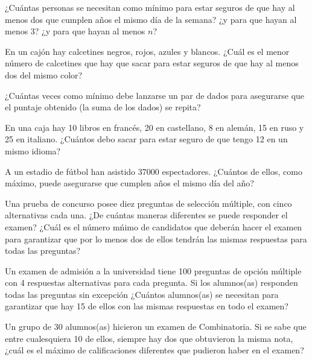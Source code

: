 \begin{problema}
    ¿Cuántas personas se necesitan como mínimo para estar seguros de que hay al menos dos que cumplen años el mismo día de la semana? ¿y para que hayan al menos 3? ¿y para que hayan al menos $n$?
\end{problema}

\begin{problema}
    En un cajón hay calcetines negros, rojos, azules y blancos. ¿Cuál es el menor número de calcetines que hay que sacar para estar seguros de que hay al menos dos del mismo color?
\end{problema}

\begin{problema}
    ¿Cuántas veces como mínimo debe lanzarse un par de dados para asegurarse que el puntaje obtenido (la suma de los dados) se repita?
\end{problema}

\begin{problema}
    En una caja hay 10 libros en francés, 20 en castellano, 8 en alemán, 15 en ruso y 25 en italiano. ¿Cuántos debo sacar para estar seguro de que tengo 12 en un mismo idioma?
\end{problema}

\begin{problema}
    A un estadio de fútbol han asistido 37000 espectadores. ¿Cuántos de ellos, como máximo, puede asegurarse que cumplen años el mismo día del año?
\end{problema}

\begin{problema}
    Una prueba de concurso posee diez preguntas de selección múltiple, con cinco alternativas cada una. ¿De cuántas maneras diferentes se puede responder el examen? ¿Cuál es el número mńimo de candidatos que deberán hacer el examen para garantizar que por lo menos dos de ellos tendrán las mismas respuestas para todas las preguntas?
\end{problema}

\begin{problema}
    Un examen de admisión a la universidad tiene 100 preguntas de opción múltiple con 4 respuestas alternativas para cada pregunta. Si los alumnos(as) responden todas las preguntas sin excepción ¿Cuántos alumnos(as) se necesitan para garantizar que hay 15 de ellos con las mismas respuestas en todo el examen?
\end{problema}

\begin{problema}
    Un grupo de 30 alumnos(as) hicieron un examen de Combinatoria. Si se sabe que entre cualesquiera 10 de ellos, siempre hay dos que obtuvieron la misma nota, ¿cuál es el máximo de calificaciones diferentes que pudieron haber en el examen?
\end{problema}


